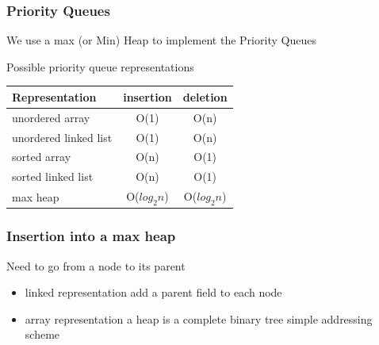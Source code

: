 \documentclass[newPxFont,sthlmFooter,nooffset]{beamer}
\begin{document}
\begin{frame}[t]
  \frametitle{Priority Queues}
We use a max (or Min) Heap to implement the Priority Queues

Possible priority queue representations

\begin{tabular}{l c c}
  Representation & insertion & deletion \\ \hline \hline
unordered array & O(1) & O(n) \\
unordered linked list & O(1) & O(n) \\
sorted array & O(n) & O(1) \\
sorted linked list & O(n) & O(1) \\
max heap & O($log_2n$) &  O($log_2n$) \\
\end{tabular}
\end{frame}


\begin{frame}[t]
  \frametitle{Insertion into a max heap}
Need to go from a node to its parent
\begin{itemize}
\item linked representation add a parent field to each node
  \item array representation a heap is a complete binary tree simple
    addressing scheme
\end{itemize}
\end{frame}
\end{document}
